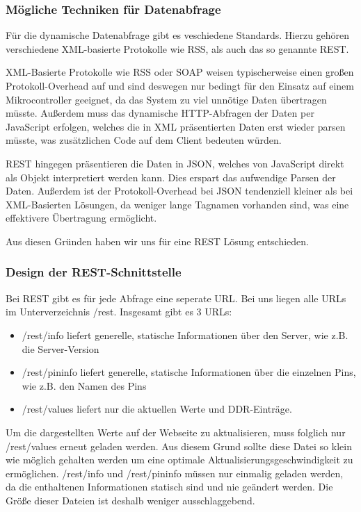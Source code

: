 \subsubsection{Mögliche Techniken für Datenabfrage}

Für die dynamische Datenabfrage gibt es veschiedene Standards. Hierzu gehören
verschiedene \acs{XML}-basierte Protokolle wie RSS, als auch das so genannte
\ac{REST}.

\acs{XML}-Basierte Protokolle wie \ac{RSS} oder \ac{SOAP} weisen typischerweise
einen großen Protokoll-Overhead auf und sind deswegen nur bedingt für den Einsatz auf einem
Mikrocontroller geeignet, da das System zu viel unnötige Daten übertragen
müsste. Außerdem muss das dynamische \acs{HTTP}-Abfragen der Daten per
JavaScript erfolgen, welches die in \acs{XML} präsentierten Daten erst wieder parsen
müsste, was zusätzlichen Code auf dem Client bedeuten würden.

\ac{REST} hingegen präsentieren die Daten in \ac{JSON}, welches von
JavaScript direkt als Objekt interpretiert werden kann. Dies erspart das
aufwendige Parsen der Daten. Außerdem ist der Protokoll-Overhead bei \ac{JSON}
tendenziell kleiner als bei \acs{XML}-Basierten Lösungen, da weniger lange
Tagnamen vorhanden sind, was eine effektivere Übertragung ermöglicht.

Aus diesen Gründen haben wir uns für eine \ac{REST} Lösung entschieden.

\subsubsection{Design der REST-Schnittstelle}
Bei \ac{REST} gibt es für jede Abfrage eine seperate \ac{URL}. Bei uns liegen
alle URLs im Unterverzeichnis \textrm{/rest}. Insgesamt gibt es 3 URLs:
\begin{itemize}
  \item  \textrm{/rest/info} liefert generelle, statische Informationen über den
  Server, wie z.B. die Server-Version
  \item  \textrm{/rest/pininfo} liefert generelle, statische Informationen über
  die einzelnen Pins, wie z.B. den Namen des Pins
  \item  \textrm{/rest/values} liefert nur die aktuellen Werte und
  \ac{DDR}-Einträge.
\end{itemize}

Um die dargestellten Werte auf der Webseite zu aktualisieren, muss folglich nur
\textrm{/rest/values} erneut geladen werden. Aus diesem Grund sollte diese
Datei so klein wie möglich gehalten werden um eine optimale
Aktualisierungsgeschwindigkeit zu ermöglichen. \textrm{/rest/info} und  
\textrm{/rest/pininfo} müssen nur einmalig geladen werden, da die enthaltenen
Informationen statisch sind und nie geändert werden. Die Größe dieser Dateien
ist deshalb weniger ausschlaggebend.
